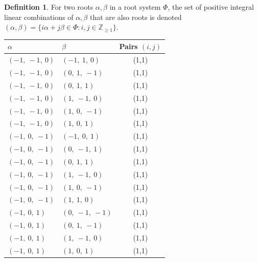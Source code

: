 \documentclass[11pt]{article}
\newcommand{\noi}{\noindent}
\theoremstyle{definition}
\newtheorem{definition}{Definition}[section]
\begin{document}
\begin{definition}
For two roots $\alpha, \beta$ in a root system $\Phi$, the set of positive integral linear combinations of $\alpha, \beta$ that are also roots is denoted
\(
	(\alpha, \beta) = \{ i \alpha + j \beta \in \Phi : i, j \in \mathbb{Z}_{\ge 1} \}
\).
\end{definition}
\noi \noindent \begin{longtable}{|l|l|c|}
    \hline
    $\alpha$ & $\beta$ & Pairs $(i,j)$ \\
    \hline
    \endhead
    $\left( -1, \  -1, \  0\right)$ & $\left( -1, \  1, \  0\right)$ & (1,1) \\
    \hline
    $\left( -1, \  -1, \  0\right)$ & $\left( 0, \  1, \  -1\right)$ & (1,1) \\
    \hline
    $\left( -1, \  -1, \  0\right)$ & $\left( 0, \  1, \  1\right)$ & (1,1) \\
    \hline
    $\left( -1, \  -1, \  0\right)$ & $\left( 1, \  -1, \  0\right)$ & (1,1) \\
    \hline
    $\left( -1, \  -1, \  0\right)$ & $\left( 1, \  0, \  -1\right)$ & (1,1) \\
    \hline
    $\left( -1, \  -1, \  0\right)$ & $\left( 1, \  0, \  1\right)$ & (1,1) \\
    \hline
    $\left( -1, \  0, \  -1\right)$ & $\left( -1, \  0, \  1\right)$ & (1,1) \\
    \hline
    $\left( -1, \  0, \  -1\right)$ & $\left( 0, \  -1, \  1\right)$ & (1,1) \\
    \hline
    $\left( -1, \  0, \  -1\right)$ & $\left( 0, \  1, \  1\right)$ & (1,1) \\
    \hline
    $\left( -1, \  0, \  -1\right)$ & $\left( 1, \  -1, \  0\right)$ & (1,1) \\
    \hline
    $\left( -1, \  0, \  -1\right)$ & $\left( 1, \  0, \  -1\right)$ & (1,1) \\
    \hline
    $\left( -1, \  0, \  -1\right)$ & $\left( 1, \  1, \  0\right)$ & (1,1) \\
    \hline
    $\left( -1, \  0, \  1\right)$ & $\left( 0, \  -1, \  -1\right)$ & (1,1) \\
    \hline
    $\left( -1, \  0, \  1\right)$ & $\left( 0, \  1, \  -1\right)$ & (1,1) \\
    \hline
    $\left( -1, \  0, \  1\right)$ & $\left( 1, \  -1, \  0\right)$ & (1,1) \\
    \hline
    $\left( -1, \  0, \  1\right)$ & $\left( 1, \  0, \  1\right)$ & (1,1) \\

\end{longtable}
\end{document}
